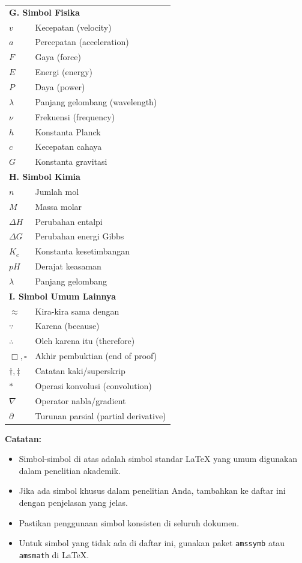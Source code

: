 \begin{tabularx}{\textwidth}{@{} l X @{}}
\multicolumn{2}{l}{\textbf{G. Simbol Fisika}} \\
$v$ & Kecepatan (velocity) \\
$a$ & Percepatan (acceleration) \\
$F$ & Gaya (force) \\
$E$ & Energi (energy) \\
$P$ & Daya (power) \\
$\lambda$ & Panjang gelombang (wavelength) \\
$\nu$ & Frekuensi (frequency) \\
$h$ & Konstanta Planck \\
$c$ & Kecepatan cahaya \\
$G$ & Konstanta gravitasi \\

\multicolumn{2}{l}{\textbf{H. Simbol Kimia}} \\
$n$ & Jumlah mol \\
$M$ & Massa molar \\
$\Delta H$ & Perubahan entalpi \\
$\Delta G$ & Perubahan energi Gibbs \\
$K_c$ & Konstanta kesetimbangan \\
$pH$ & Derajat keasaman \\
$\lambda$ & Panjang gelombang \\

\multicolumn{2}{l}{\textbf{I. Simbol Umum Lainnya}} \\
$\approx$ & Kira-kira sama dengan \\
$\because$ & Karena (because) \\
$\therefore$ & Oleh karena itu (therefore) \\
$\Box, \square$ & Akhir pembuktian (end of proof) \\
$\dagger, \ddagger$ & Catatan kaki/superskrip \\
$\ast$ & Operasi konvolusi (convolution) \\
$\nabla$ & Operator nabla/gradient \\
$\partial$ & Turunan parsial (partial derivative) \\

\bottomrule
\end{tabularx}

\vspace{0.5cm}

\noindent
\textbf{Catatan:}
\begin{itemize}
  \item Simbol-simbol di atas adalah simbol standar LaTeX yang umum digunakan dalam penelitian akademik.
  \item Jika ada simbol khusus dalam penelitian Anda, tambahkan ke daftar ini dengan penjelasan yang jelas.
  \item Pastikan penggunaan simbol konsisten di seluruh dokumen.
  \item Untuk simbol yang tidak ada di daftar ini, gunakan paket \texttt{amssymb} atau \texttt{amsmath} di LaTeX.
\end{itemize}
